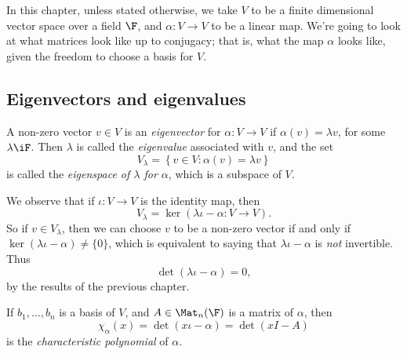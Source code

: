 \setcounter{lecture}{3}

In this chapter, unless stated otherwise, we take $V$ to be a finite dimensional vector space over a field $\F$, and $\alpha:V\to V$ to be a linear map. We're going to look at what matrices look like up to conjugacy; that is, what the map $\alpha$ looks like, given the freedom to choose a basis for $V$.

% 

\subsection{Eigenvectors and eigenvalues} %
\label{sub:eigenvectors_and_eigenvalues}

\begin{definition}
	A non-zero vector $v\in V$ is an \emph{eigenvector} for $\alpha:V\to V$ if $\alpha(v)=\lambda v$, for some $\lambda\iF$. Then $\lambda$ is called the \emph{eigenvalue} associated with $v$, and the set
	\begin{equation*}
		V_\lambda = \left\{v\in V:\alpha(v)=\lambda v\right\}
	\end{equation*}
	is called the \emph{eigenspace of $\lambda$ for $\alpha$}, which is a subspace of $V$.
\end{definition}

We observe that if $\iota : V \to V$ is the identity map, then
\begin{equation*}
	V_\lambda = \ker(\lambda \iota-\alpha:V\to V).
\end{equation*}
So if $v\in V_\lambda$, then we can choose $v$ to be a non-zero vector if and only if $\ker(\lambda \iota-\alpha)\neq \{0\}$, which is equivalent to saying that $\lambda \iota-\alpha$ is \emph{not} invertible. Thus
\begin{equation*}
	\det(\lambda \iota-\alpha) = 0,
\end{equation*}
by the results of the previous chapter.

\begin{definition}
	If $b_1,\ldots,b_n$ is a basis of $V$, and $A\in\Mat_n(\F)$ is a matrix of $\alpha$, then
	\begin{equation*}
		\chi_\alpha(x) = \det(x\iota-\alpha) = \det(xI-A)
	\end{equation*}
	is the \emph{characteristic polynomial} of $\alpha$.
\end{definition}

